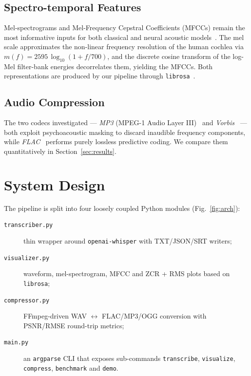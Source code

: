\documentclass[conference]{IEEEtran}
\begin{document}
\subsection{Spectro-temporal Features}
Mel-spectrograms and Mel-Frequency Cepstral Coefficients (MFCCs) remain
the most informative inputs for both classical and neural acoustic
models~\cite{davis1980comparison}.  The mel scale approximates the
non-linear frequency resolution of the human cochlea via
$m(f) = 2595\,\log_{10}(1 + f/700)$, and the discrete cosine transform of
the log-Mel filter-bank energies decorrelates them, yielding the MFCCs.
Both representations are produced by our pipeline through
\texttt{librosa}~\cite{mcfee2015librosa}.

\subsection{Audio Compression}
The two codecs investigated --- \emph{MP3} (MPEG-1 Audio Layer III)~\cite{brandenburg1999mp3}
and \emph{Vorbis}~\cite{xiph2004vorbis} --- both exploit psychoacoustic
masking to discard inaudible frequency components, while \emph{FLAC}~\cite{coalson2008flac}
performs purely lossless predictive coding.  We compare them quantitatively
in Section~\ref{sec:results}.

\section{System Design}\label{sec:design}
The pipeline is split into four loosely coupled Python modules
(Fig.~\ref{fig:arch}):
\begin{description}
  \item[\texttt{transcriber.py}] thin wrapper around \texttt{openai-whisper}
        with TXT/JSON/SRT writers;
  \item[\texttt{visualizer.py}] waveform, mel-spectrogram, MFCC and
        ZCR + RMS plots based on \texttt{librosa};
  \item[\texttt{compressor.py}] FFmpeg-driven WAV $\leftrightarrow$
        FLAC/MP3/OGG conversion with PSNR/RMSE round-trip metrics;
  \item[\texttt{main.py}] an \texttt{argparse} CLI that exposes
        sub-commands \texttt{transcribe}, \texttt{visualize},
        \texttt{compress}, \texttt{benchmark} and \texttt{demo}.
\end{description}
\end{document}
